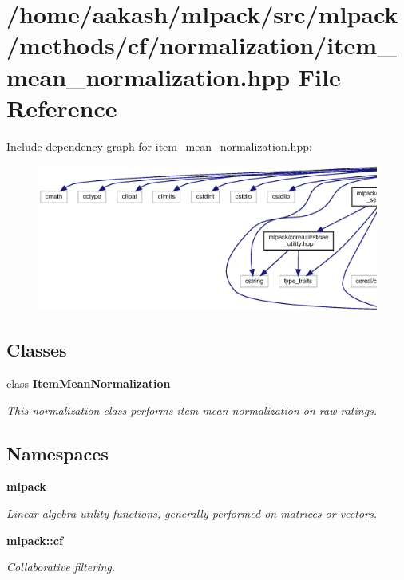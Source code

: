 \section{/home/aakash/mlpack/src/mlpack/methods/cf/normalization/item\+\_\+mean\+\_\+normalization.hpp File Reference}
\label{item__mean__normalization_8hpp}
Include dependency graph for item\+\_\+mean\+\_\+normalization.\+hpp\+:
\nopagebreak
\begin{figure}[H]
\begin{center}
\leavevmode
\includegraphics[width=350pt]{item__mean__normalization_8hpp__incl}
\end{center}
\end{figure}
\subsection*{Classes}
\begin{DoxyCompactItemize}
\item 
class \textbf{ Item\+Mean\+Normalization}
\begin{DoxyCompactList}\small\item\em This normalization class performs item mean normalization on raw ratings. \end{DoxyCompactList}\end{DoxyCompactItemize}
\subsection*{Namespaces}
\begin{DoxyCompactItemize}
\item 
 \textbf{ mlpack}
\begin{DoxyCompactList}\small\item\em Linear algebra utility functions, generally performed on matrices or vectors. \end{DoxyCompactList}\item 
 \textbf{ mlpack\+::cf}
\begin{DoxyCompactList}\small\item\em Collaborative filtering. \end{DoxyCompactList}\end{DoxyCompactItemize}


